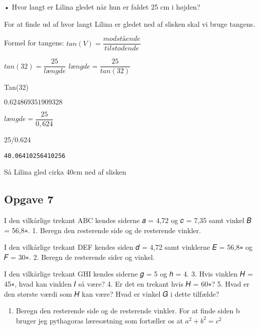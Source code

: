 \documentclass[
  a4paper,
]{article}
\newenvironment{Shaded}{\begin{snugshade}}{\end{snugshade}}
\newcommand{\DecValTok}[1]{\textcolor[rgb]{0.68,0.00,0.00}{#1}}
\newcommand{\FloatTok}[1]{\textcolor[rgb]{0.68,0.00,0.00}{#1}}
\newcommand{\NormalTok}[1]{\textcolor[rgb]{0.00,0.23,0.31}{#1}}
\newcommand{\OperatorTok}[1]{\textcolor[rgb]{0.37,0.37,0.37}{#1}}
\providecommand{\tightlist}{%
  \setlength{\itemsep}{0pt}\setlength{\parskip}{0pt}}\usepackage{longtable,booktabs,array}
\begin{document}
• Hvor langt er Lilina gledet når hun er faldet 25 cm i højden?

For at finde ud af hvor langt Lilina er gledet ned af slisken skal vi
bruge tangens.

Formel for tangens: \(tan(V)=\dfrac{modstående}{tilstødende}\)

\(tan(32)=\dfrac{25}{længde}\) \(længde = \dfrac{25}{tan(32)}\)

\begin{Shaded}
\begin{Highlighting}[]
\NormalTok{Tan(}\DecValTok{32}\NormalTok{)}
\end{Highlighting}
\end{Shaded}

$\displaystyle 0.624869351909328$

\(længde = \dfrac{25}{0,624}\)

\begin{Shaded}
\begin{Highlighting}[]
\DecValTok{25}\OperatorTok{/}\FloatTok{0.624}
\end{Highlighting}
\end{Shaded}

\begin{verbatim}
40.06410256410256
\end{verbatim}

Så Lilina gled cirka 40cm ned af slisken

\hypertarget{opgave-7}{%
\subsection{Opgave 7}\label{opgave-7}}

I den vilkårlige trekant ABC kendes siderne 𝑎 = 4,72 og 𝑐 = 7,35 samt
vinkel 𝐵 = 56,8∘. 1. Beregn den resterende side og de resterende
vinkler.

I den vilkårlige trekant DEF kendes siden 𝑑 = 4,72 samt vinklerne 𝐸 =
56,8∘ og 𝐹 = 30∘. 2. Beregn de resterende sider og vinkel.

I den vilkårlige trekant GHI kendes siderne 𝑔 = 5 og ℎ = 4. 3. Hvis
vinklen 𝐻 = 45∘, hvad kan vinklen 𝐼 så være? 4. Er det en trekant hvis 𝐻
= 60∘? 5. Hvad er den største værdi som 𝐻 kan være? Hvad er vinkel 𝐺 i
dette tilfælde?

\begin{enumerate}
\def\labelenumi{\arabic{enumi}.}
\tightlist
\item
  Beregn den resterende side og de resterende vinkler. For at finde
  siden b bruger jeg pythagoras læresætning som fortæller os at
  \(a^2 + b^2 = c^2\)
\end{enumerate}
\end{document}
